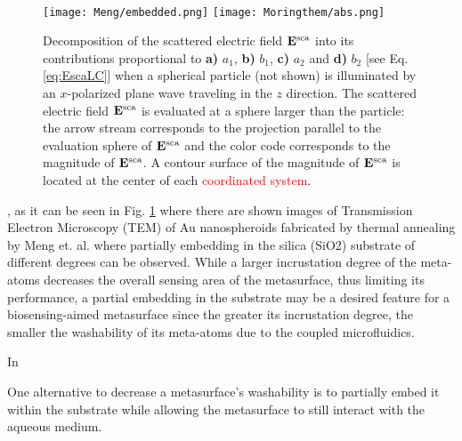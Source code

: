\begin{figure}[h!]\centering
\hspace*{-.795\textwidth}
    \begin{subfigure}{1.075\textwidth}\caption{\hfill }\label{sfig:inc:1}\end{subfigure}%
  	\begin{subfigure}{.19\textwidth}\caption{\hfill }\label{sfig:inc:2}\end{subfigure}\\[-1.225em]
  	\texttt{[image: Meng/embedded.png]}%
  		\hspace*{1em}
  	 \texttt{[image: Moringthem/abs.png]}
  \caption[Multipolar Contributions to the Scattered Electric Field]{ Decomposition of the  scattered electric field $\vb{E}^\text{sca}$ into its contributions  proportional to \textbf{a)} $a_1$,  \textbf{b)}  $b_1$, \textbf{c)} $a_2$ and \textbf{d)} $b_2$ [see Eq. \eqref{eq:EscaLC}] when a spherical particle (not shown) is illuminated by an $x$-polarized plane wave traveling in the $z$ direction. The scattered electric field $\vb{E}^\text{sca}$ is evaluated at a sphere larger than the particle: the arrow stream corresponds to the projection parallel to the evaluation sphere of $\vb{E}^\text{sca}$  and the color code corresponds to the magnitude of  $\vb{E}^\text{sca}$. A contour surface of the magnitude of $\vb{E}^\text{sca}$ is located at the center of each \textcolor{red}{coordinated system}. }
\label{fig:IncPapers}
\end{figure}


, as it can be seen in Fig. \ref{sfig:inc:1} where there are shown images of Transmission Electron Microscopy (TEM) of Au nanospheroids fabricated by thermal annealing by Meng et. al. \cite{meng_anisotropic_2015} where partially embedding  in the silica (SiO2) substrate of different degrees can be observed. While a larger incrustation degree of the meta-atoms decreases the overall sensing area of the metasurface, thus limiting its performance, a partial embedding in the substrate may be a desired feature for a biosensing-aimed metasurface since the greater its incrustation degree, the smaller the washability  of its meta-atoms due to the coupled microfluidics. 

 In


 One alternative to decrease a metasurface's washability is to partially embed it within the substrate while allowing the metasurface to still interact with the aqueous medium. 
 
